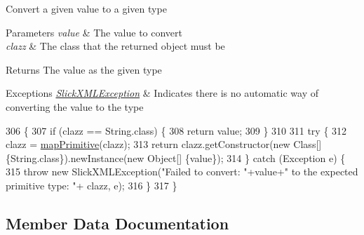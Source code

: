 Convert a given value to a given type


\begin{DoxyParams}{Parameters}
{\em value} & The value to convert \\
\hline
{\em clazz} & The class that the returned object must be \\
\hline
\end{DoxyParams}
\begin{DoxyReturn}{Returns}
The value as the given type 
\end{DoxyReturn}

\begin{DoxyExceptions}{Exceptions}
{\em \mbox{\hyperlink{classorg_1_1newdawn_1_1slick_1_1util_1_1xml_1_1_slick_x_m_l_exception}{Slick\+X\+M\+L\+Exception}}} & Indicates there is no automatic way of converting the value to the type \\
\hline
\end{DoxyExceptions}

\begin{DoxyCode}
306                                                                                  \{
307         \textcolor{keywordflow}{if} (clazz == String.class) \{
308             \textcolor{keywordflow}{return} value;
309         \}
310 
311         \textcolor{keywordflow}{try} \{
312             clazz = \mbox{\hyperlink{classorg_1_1newdawn_1_1slick_1_1util_1_1xml_1_1_object_tree_parser_a26a6afeae2913c5b30e54d78b2996fb7}{mapPrimitive}}(clazz);
313             \textcolor{keywordflow}{return} clazz.getConstructor(\textcolor{keyword}{new} Class[] \{String.class\}).newInstance(\textcolor{keyword}{new} Object[] \{value\});
314         \} \textcolor{keywordflow}{catch} (Exception e) \{
315             \textcolor{keywordflow}{throw} \textcolor{keyword}{new} SlickXMLException(\textcolor{stringliteral}{"Failed to convert: "}+value+\textcolor{stringliteral}{" to the expected primitive type: "}+
      clazz, e);
316         \}
317     \}
\end{DoxyCode}


\subsection{Member Data Documentation}
\mbox{\label{classorg_1_1newdawn_1_1slick_1_1util_1_1xml_1_1_object_tree_parser_a063295dc4b123cde10949867045f71e6}} 
